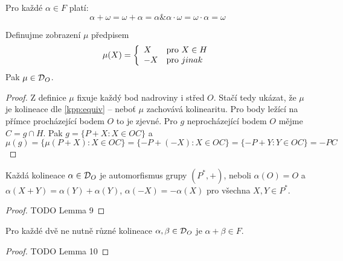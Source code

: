 \begin{observation}
	Pro každé $\alpha \in F$ platí:
	\[ \alpha + \omega = \omega + \alpha = \alpha \& \alpha \cdot \omega = \omega \cdot \alpha = \omega \]
\end{observation}

\begin{lemma}[O zobrazení $\mu$]
    Definujme zobrazení $\mu$ předpisem
    \[ \mu(X) = \left\{ \begin{array}{ll} X & \mbox{pro } X \in H \\ -X & \mbox{pro } jinak \end{array} \right. \]
    Pak $\mu\in \operatorname{\mathcal{D}}_O$.
\end{lemma}
\begin{proof}
    Z definice $\mu$ fixuje každý bod nadroviny i střed $O$.
    Stačí tedy ukázat, že $\mu$ je kolineace dle \cref{kpp:equiv} -- neboť $\mu$ zachovává kolinearitu.
    Pro body ležící na přímce procházející bodem $O$ to je zjevné.
    Pro $g$ neprocházející bodem $O$ mějme $C=g\cap H$.
    Pak $g=\{P+X: X\in OC\}$ a
    \[ \mu(g) = \{\mu(P+X): X\in OC\} = \{-P+(-X):X\in OC\}=\{-P+Y: Y\in OC\}=-PC \]
\end{proof}
\begin{lemma}
    Každá kolineace $\alpha\in \operatorname{\mathcal{D}}_O$ je automorfismus grupy $(P^*,+)$, neboli $\alpha(O)=O$ a $\alpha(X+Y)=\alpha(Y)+\alpha(Y)$, $\alpha(-X)=-\alpha(X)$ pro všechna $X,Y\in P^*$.
\end{lemma}
\begin{proof}
    TODO Lemma 9
\end{proof}
\begin{lemma}
    Pro každé dvě ne nutně různé kolineace $\alpha,\beta\in \operatorname{\mathcal{D}}_O$ je $\alpha+\beta\in F$.
\end{lemma}
\begin{proof}
    TODO Lemma 10
\end{proof}

